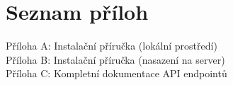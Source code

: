 \newpage
{}
\listoffigures

\newpage
{}
\listoftables

\newpage
\chapter*{Seznam příloh}
\noindent Příloha A: Instalační příručka (lokální prostředí)\\
\noindent Příloha B: Instalační příručka (nasazení na server)\\
\noindent Příloha C: Kompletní dokumentace API endpointů